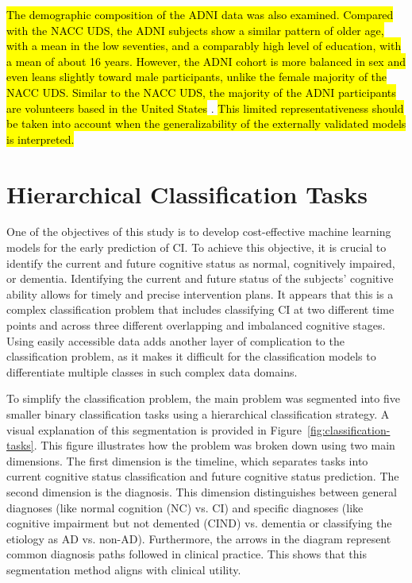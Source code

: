 \hl{The demographic composition of the ADNI data was also examined. Compared with the NACC UDS, the ADNI subjects show a similar pattern of older age, with a mean in the low seventies, and a comparably high level of education, with a mean of about 16 years. However, the ADNI cohort is more balanced in sex and even leans slightly toward male participants, unlike the female majority of the NACC UDS. Similar to the NACC UDS, the majority of the ADNI participants are volunteers based in the United States} \cite{Weiner2024Overview}. \hl{This limited representativeness should be taken into account when the generalizability of the externally validated models is interpreted.}

\section{Hierarchical Classification Tasks}
One of the objectives of this study is to develop cost-effective machine learning models for the early prediction of CI. To achieve this objective, it is crucial to identify the current and future cognitive status as normal, cognitively impaired, or dementia. Identifying the current and future status of the subjects' cognitive ability allows for timely and precise intervention plans. It appears that this is a complex classification problem that includes classifying CI at two different time points and across three different overlapping and imbalanced cognitive stages. Using easily accessible data adds another layer of complication to the classification problem, as it makes it difficult for the classification models to differentiate multiple classes in such complex data domains. 

To simplify the classification problem, the main problem was segmented into five smaller binary classification tasks using a hierarchical classification strategy. A visual explanation of this segmentation is provided in Figure~\ref{fig:classification-tasks}. This figure illustrates how the problem was broken down using two main dimensions. The first dimension is the timeline, which separates tasks into current cognitive status classification and future cognitive status prediction. The second dimension is the diagnosis. This dimension distinguishes between general diagnoses (like normal cognition (\acrshort{NC}) vs. CI) and specific diagnoses (like cognitive impairment but not demented (\acrshort{CIND}) vs. dementia or classifying the etiology as AD vs. non-AD). Furthermore, the arrows in the diagram represent common diagnosis paths followed in clinical practice. This shows that this segmentation method aligns with clinical utility.

